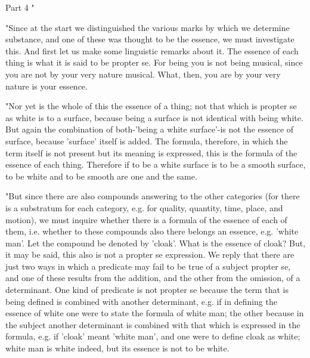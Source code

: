 Part 4 "

"Since at the start we distinguished the various marks by which we
determine substance, and one of these was thought to be the essence,
we must investigate this. And first let us make some linguistic remarks
about it. The essence of each thing is what it is said to be propter
se. For being you is not being musical, since you are not by your
very nature musical. What, then, you are by your very nature is your
essence. 

"Nor yet is the whole of this the essence of a thing; not that which
is propter se as white is to a surface, because being a surface is
not identical with being white. But again the combination of both-'being
a white surface'-is not the essence of surface, because 'surface'
itself is added. The formula, therefore, in which the term itself
is not present but its meaning is expressed, this is the formula of
the essence of each thing. Therefore if to be a white surface is to
be a smooth surface, to be white and to be smooth are one and the
same. 

"But since there are also compounds answering to the other categories
(for there is a substratum for each category, e.g. for quality, quantity,
time, place, and motion), we must inquire whether there is a formula
of the essence of each of them, i.e. whether to these compounds also
there belongs an essence, e.g. 'white man'. Let the compound be denoted
by 'cloak'. What is the essence of cloak? But, it may be said, this
also is not a propter se expression. We reply that there are just
two ways in which a predicate may fail to be true of a subject propter
se, and one of these results from the addition, and the other from
the omission, of a determinant. One kind of predicate is not propter
se because the term that is being defined is combined with another
determinant, e.g. if in defining the essence of white one were to
state the formula of white man; the other because in the subject another
determinant is combined with that which is expressed in the formula,
e.g. if 'cloak' meant 'white man', and one were to define cloak as
white; white man is white indeed, but its essence is not to be white.

